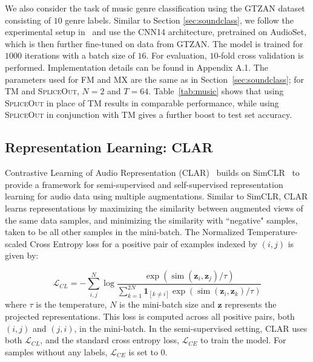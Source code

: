 \documentclass{article}
\newcommand{\SpA}{{\textsc{SpliceOut}}\xspace}
\begin{document}
We also consider the task of music genre classification using the GTZAN dataset~\citep{gtzan} consisting of $10$ genre labels. Similar to Section \ref{sec:soundclass}, we follow the experimental setup in~\citep{panns} and use the CNN14 architecture, pretrained on AudioSet, which is then further fine-tuned on data from GTZAN. The model is trained for $1000$ iterations with a batch size of $16$. For evaluation, $10$-fold cross validation is performed. Implementation details can be found in Appendix A.1. The parameters used for FM and MX are the same as in Section~\ref{sec:soundclass}; for TM and \SpA, $N=2$ and $T=64$. Table~\ref{tab:music} shows that using \SpA in place of TM results in comparable performance, while using \SpA in conjunction with TM gives a further boost to test set accuracy.



\subsection{Representation Learning: CLAR}

Contrastive Learning of Audio Representation (CLAR)~\citep{clar} builds on SimCLR~\citep{chen2020simple} to provide a framework for semi-supervised and self-supervised representation learning for audio data using multiple augmentations. Similar to SimCLR, CLAR learns representations by maximizing the similarity between augmented views of the same data samples, and minimizing the similarity with ``negative" samples, taken to be all other samples in the mini-batch. The Normalized Temperature-scaled Cross Entropy loss for a positive pair of examples indexed by $(i, j)$ is given by:

$$
\mathcal{L}_{CL}=-\sum_{i, j}^{N} \log \frac{\exp \left(\operatorname{sim}\left(\mathbf{z}_{i}, \mathbf{z}_{j}\right) / \tau\right)}{\sum_{k=1}^{2 N} \mathbf{1}_{[k \neq i]} \exp \left(\operatorname{sim}\left(\mathbf{z}_{i}, \mathbf{z}_{k}\right) / \tau\right)}
$$
where $\tau$ is the temperature, $N$ is the mini-batch size and $\mathbf{z}$ represents the projected representations. This loss is computed across all positive pairs, both $(i, j)$ and $(j, i)$, in the mini-batch. In the semi-supervised setting, CLAR uses both $\mathcal{L}_{CL}$, and the standard cross entropy loss, $\mathcal{L}_{CE}$ to train the model. For samples without any labels, $\mathcal{L}_{CE}$ is set to $0$. 
\end{document}
